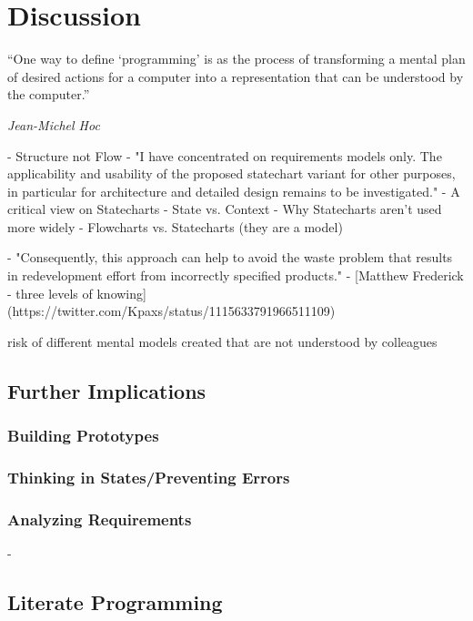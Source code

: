 \chapter{Discussion}
\label{chap:discussion}
\epigraph{``One way to define `programming' is as the process of transforming a mental plan of desired actions for a computer into a representation that can be understood by the computer.''}{\textit{Jean-Michel Hoc}}
- Structure not Flow \autocite{melia_comparison_2016}
- "I have concentrated on requirements models only. The applicability and usability of the proposed statechart variant for other purposes, in particular for architecture and detailed design remains to be investigated." \autocite[5]{glinz_statecharts_2002}
- A critical view on Statecharts \autocite{breen_statecharts_2004}
- State vs. Context \autocite[36]{leveson_experiences_1991}
- Why Statecharts aren't used more widely \autocite[9]{harel_statecharts_2007}
- Flowcharts vs. Statecharts (they are a model) \autocite[10]{harel_statecharts_2007}

- "Consequently, this approach can help to avoid the waste problem that results in redevelopment effort from incorrectly specified products." \autocite[10]{sheldon_software_2000}
- [Matthew Frederick - three levels of knowing](https://twitter.com/Kpaxs/status/1115633791966511109)

risk of different mental models created that are not understood by colleagues

\section{Further Implications}
\subsection{Building Prototypes}
\subsection{Thinking in States/Preventing Errors}
\subsection{Analyzing Requirements}
- \autocite{leveson_experiences_1991}

\section{Literate Programming}
